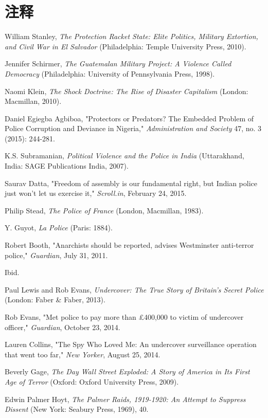 \documentclass[fontset=fandol, a4paper, 12pt, openright]{ctexbook}
\begin{document}
\section*{注释}
\begin{enumerate}[label={[\arabic*]}]
    \item William Stanley, \textit{The Protection Racket State: Elite Politics, Military Extortion, and Civil War in El Salvador} (Philadelphia: Temple University Press, 2010).
    \item Jennifer Schirmer, \textit{The Guatemalan Military Project: A Violence Called Democracy} (Philadelphia: University of Pennsylvania Press, 1998).
    \item Naomi Klein, \textit{The Shock Doctrine: The Rise of Disaster Capitalism} (London: Macmillan, 2010).
    \item Daniel Egiegba Agbiboa, "Protectors or Predators? The Embedded Problem of Police Corruption and Deviance in Nigeria," \textit{Administration and Society} 47, no. 3 (2015): 244-281.
    \item K.S. Subramanian, \textit{Political Violence and the Police in India} (Uttarakhand, India: SAGE Publications India, 2007).
    \item Saurav Datta, "Freedom of assembly is our fundamental right, but Indian police just won't let us exercise it," \textit{Scroll.in}, February 24, 2015.
    \item Philip Stead, \textit{The Police of France} (London, Macmillan, 1983).
    \item Y. Guyot, \textit{La Police} (Paris: 1884).
    \item Robert Booth, "Anarchists should be reported, advises Westminster anti-terror police," \textit{Guardian}, July 31, 2011.
    \item Ibid.
    \item Paul Lewis and Rob Evans, \textit{Undercover: The True Story of Britain's Secret Police} (London: Faber \& Faber, 2013).
    \item Rob Evans, "Met police to pay more than \pounds400,000 to victim of undercover officer," \textit{Guardian}, October 23, 2014.
    \item Lauren Collins, "The Spy Who Loved Me: An undercover surveillance operation that went too far," \textit{New Yorker}, August 25, 2014.
    \item Beverly Gage, \textit{The Day Wall Street Exploded: A Story of America in Its First Age of Terror} (Oxford: Oxford University Press, 2009).
    \item Edwin Palmer Hoyt, \textit{The Palmer Raids, 1919-1920: An Attempt to Suppress Dissent} (New York: Seabury Press, 1969), 40.

\end{enumerate}
\end{document}

